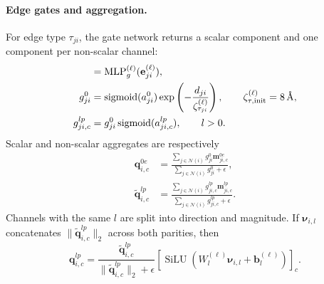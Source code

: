 \paragraph{Edge gates and aggregation.}
For edge type \(\tau_{ji}\), the gate network returns a scalar component and
one component per non-scalar channel:
\begin{align}
    [a_{ji}^{0},\mathbf{a}_{ji}^{\mathrm{ns}}]
    &=
    \operatorname{MLP}_{g}^{(\ell)}
    (\mathbf{e}_{ji}^{(\ell)}),\\
    g_{ji}^{0}
    &=
    \operatorname{sigmoid}(a_{ji}^{0})
    \exp\left(-\frac{d_{ji}}{\zeta_{\tau_{ji}}^{(\ell)}}\right),
    \qquad
    \zeta_{\tau,\mathrm{init}}^{(\ell)}=8\,\angstrom,\\
    g_{ji,c}^{lp}
    &=
    g_{ji}^{0}\operatorname{sigmoid}(a_{ji,c}^{lp}),
    \qquad l>0.
    \label{eq:edge_gates}
\end{align}
Scalar and non-scalar aggregates are respectively
\begin{align}
    \mathbf{q}_{i,c}^{0e}
    &=
    \frac{
      \sum_{j\in\mathcal{N}(i)}
      g_{ji}^{0}\mathbf{m}_{ji,c}^{0e}
    }{
      \sum_{j\in\mathcal{N}(i)}g_{ji}^{0}+\epsilon
    },
    \label{eq:scalar_aggregation}\\
    \widetilde{\mathbf{q}}_{i,c}^{lp}
    &=
    \frac{
      \sum_{j\in\mathcal{N}(i)}
      g_{ji,c}^{lp}\mathbf{m}_{ji,c}^{lp}
    }{
      \sum_{j\in\mathcal{N}(i)}g_{ji,c}^{lp}+\epsilon
    }.
    \label{eq:nonscalar_aggregation}
\end{align}
Channels with the same \(l\) are split into direction and magnitude. If
\(\boldsymbol{\nu}_{i,l}\) concatenates
\(\|\widetilde{\mathbf{q}}_{i,c}^{lp}\|_2\) across both parities, then
\begin{equation}
    \mathbf{q}_{i,c}^{lp}
    =
    \frac{\widetilde{\mathbf{q}}_{i,c}^{lp}}
         {\|\widetilde{\mathbf{q}}_{i,c}^{lp}\|_2+\epsilon}
    \left[
      \operatorname{SiLU}
      (W_l^{(\ell)}\boldsymbol{\nu}_{i,l}+\mathbf{b}_l^{(\ell)})
    \right]_c.
    \label{eq:nonscalar_rescale}
\end{equation}


